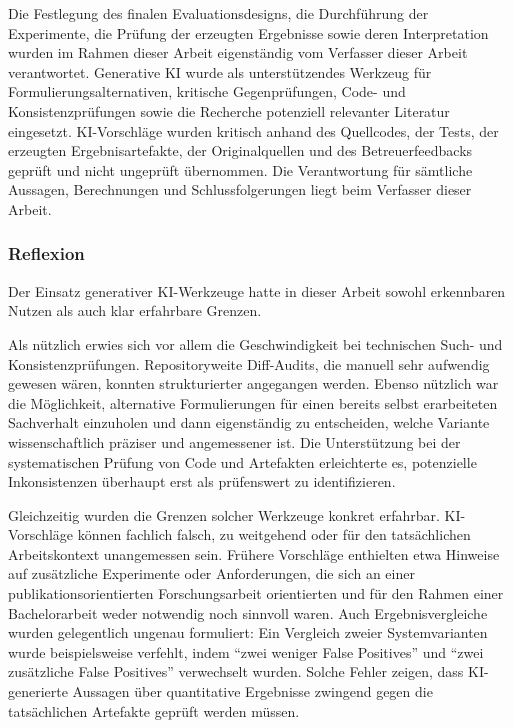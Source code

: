 Die Festlegung des finalen Evaluationsdesigns, die Durchführung der Experimente,
die Prüfung der erzeugten Ergebnisse sowie deren Interpretation wurden im Rahmen
dieser Arbeit eigenständig vom Verfasser dieser Arbeit verantwortet. Generative KI wurde als unterstützendes Werkzeug für
Formulierungsalternativen, kritische Gegenprüfungen, Code- und
Konsistenzprüfungen sowie die Recherche potenziell relevanter Literatur
eingesetzt. KI-Vorschläge wurden kritisch anhand des
Quellcodes, der Tests, der erzeugten Ergebnisartefakte, der Originalquellen und
des Betreuerfeedbacks geprüft und nicht ungeprüft übernommen. Die Verantwortung für sämtliche Aussagen,
Berechnungen und Schlussfolgerungen liegt beim Verfasser dieser Arbeit.

\subsubsection*{Reflexion}

Der Einsatz generativer KI-Werkzeuge hatte in dieser Arbeit sowohl erkennbaren
Nutzen als auch klar erfahrbare Grenzen.

Als nützlich erwies sich vor allem die Geschwindigkeit bei technischen Such- und
Konsistenzprüfungen. Repositoryweite Diff-Audits, die manuell sehr aufwendig
gewesen wären, konnten strukturierter angegangen werden. Ebenso nützlich war die
Möglichkeit, alternative Formulierungen für einen bereits selbst erarbeiteten
Sachverhalt einzuholen und dann eigenständig zu entscheiden, welche Variante
wissenschaftlich präziser und angemessener ist. Die Unterstützung bei der
systematischen Prüfung von Code und Artefakten erleichterte es, potenzielle
Inkonsistenzen überhaupt erst als prüfenswert zu identifizieren.

Gleichzeitig wurden die Grenzen solcher Werkzeuge konkret erfahrbar.
KI-Vor\-schläge können fachlich falsch, zu weitgehend oder für den tatsächlichen
Arbeitskontext unangemessen sein. Frühere Vorschläge enthielten etwa Hinweise auf
zusätzliche Experimente oder Anforderungen, die sich an einer
publikationsorientierten Forschungsarbeit orientierten und für den Rahmen einer
Bachelorarbeit weder notwendig noch sinnvoll waren. Auch Ergebnisvergleiche
wurden gelegentlich ungenau formuliert: Ein Vergleich zweier Systemvarianten
wurde beispielsweise verfehlt, indem \enquote{zwei weniger False Positives} und \enquote{zwei zusätzliche False Positives} verwechselt wurden. Solche Fehler zeigen, dass KI-generierte Aussagen
über quantitative Ergebnisse zwingend gegen die tatsächlichen Artefakte geprüft
werden müssen.

